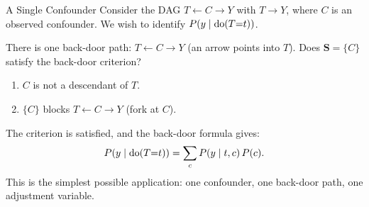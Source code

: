 \documentclass[master.tex]{subfiles}
\begin{document}
\begin{example}{A Single Confounder}
\label{w3:ex:singleconf}
Consider the DAG $T \leftarrow C \to Y$ with $T \to Y$, where $C$ is an
observed confounder.  We wish to identify $P(y \mid \mathrm{do}(T{=}t))$.

\begin{center}
\end{center}

\noindent
There is one back-door path: $T \leftarrow C \to Y$ (an arrow points into
$T$).  Does $\mathbf{S} = \{C\}$ satisfy the back-door criterion?
\begin{enumerate}
  \item $C$ is not a descendant of $T$. \checkmark
  \item $\{C\}$ blocks $T \leftarrow C \to Y$ (fork at $C$). \checkmark
\end{enumerate}
The criterion is satisfied, and the back-door formula gives:
\[
  P(y \mid \mathrm{do}(T{=}t)) = \sum_c P(y \mid t, c)\,P(c).
\]
This is the simplest possible application: one confounder, one back-door
path, one adjustment variable.
\end{example}
\end{document}
